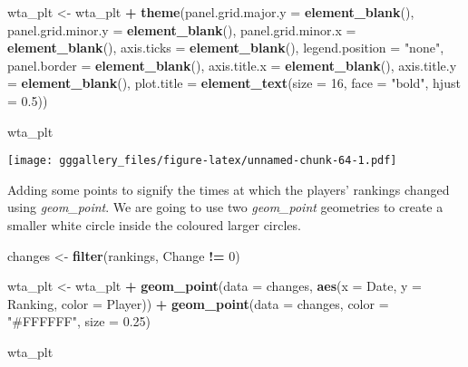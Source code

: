 \documentclass[]{book}
\newenvironment{Shaded}{\begin{snugshade}}{\end{snugshade}}
\newcommand{\DataTypeTok}[1]{\textcolor[rgb]{0.13,0.29,0.53}{#1}}
\newcommand{\DecValTok}[1]{\textcolor[rgb]{0.00,0.00,0.81}{#1}}
\newcommand{\FloatTok}[1]{\textcolor[rgb]{0.00,0.00,0.81}{#1}}
\newcommand{\KeywordTok}[1]{\textcolor[rgb]{0.13,0.29,0.53}{\textbf{#1}}}
\newcommand{\NormalTok}[1]{#1}
\newcommand{\OperatorTok}[1]{\textcolor[rgb]{0.81,0.36,0.00}{\textbf{#1}}}
\newcommand{\StringTok}[1]{\textcolor[rgb]{0.31,0.60,0.02}{#1}}
\begin{document}
\begin{Shaded}
\begin{Highlighting}[]
\NormalTok{wta_plt <-}\StringTok{ }\NormalTok{wta_plt }\OperatorTok{+}\StringTok{ }
\StringTok{  }\KeywordTok{theme}\NormalTok{(}\DataTypeTok{panel.grid.major.y =} \KeywordTok{element_blank}\NormalTok{(), }\DataTypeTok{panel.grid.minor.y =} \KeywordTok{element_blank}\NormalTok{(),}
        \DataTypeTok{panel.grid.minor.x =} \KeywordTok{element_blank}\NormalTok{(), }\DataTypeTok{axis.ticks =} \KeywordTok{element_blank}\NormalTok{(), }
        \DataTypeTok{legend.position =} \StringTok{"none"}\NormalTok{, }\DataTypeTok{panel.border =} \KeywordTok{element_blank}\NormalTok{(),}
        \DataTypeTok{axis.title.x =} \KeywordTok{element_blank}\NormalTok{(), }\DataTypeTok{axis.title.y =} \KeywordTok{element_blank}\NormalTok{(),}
        \DataTypeTok{plot.title =} \KeywordTok{element_text}\NormalTok{(}\DataTypeTok{size =} \DecValTok{16}\NormalTok{, }\DataTypeTok{face =} \StringTok{"bold"}\NormalTok{, }\DataTypeTok{hjust =} \FloatTok{0.5}\NormalTok{)) }

\NormalTok{wta_plt}
\end{Highlighting}
\end{Shaded}

\texttt{[image: gggallery\_files/figure-latex/unnamed-chunk-64-1.pdf]}

Adding some points to signify the times at which the players' rankings changed using \emph{geom\_point}.
We are going to use two \emph{geom\_point} geometries to create a smaller white circle inside the coloured larger circles.

\begin{Shaded}
\begin{Highlighting}[]
\NormalTok{changes <-}\StringTok{ }\KeywordTok{filter}\NormalTok{(rankings, Change }\OperatorTok{!=}\StringTok{ }\DecValTok{0}\NormalTok{)}


\NormalTok{wta_plt <-}\StringTok{ }\NormalTok{wta_plt }\OperatorTok{+}\StringTok{ }\KeywordTok{geom_point}\NormalTok{(}\DataTypeTok{data =}\NormalTok{ changes, }\KeywordTok{aes}\NormalTok{(}\DataTypeTok{x =}\NormalTok{ Date, }\DataTypeTok{y =}\NormalTok{ Ranking, }\DataTypeTok{color =}\NormalTok{ Player)) }\OperatorTok{+}
\StringTok{  }\KeywordTok{geom_point}\NormalTok{(}\DataTypeTok{data =}\NormalTok{ changes, }\DataTypeTok{color =} \StringTok{"#FFFFFF"}\NormalTok{, }\DataTypeTok{size =} \FloatTok{0.25}\NormalTok{) }

\NormalTok{wta_plt}
\end{Highlighting}
\end{Shaded}
\end{document}
